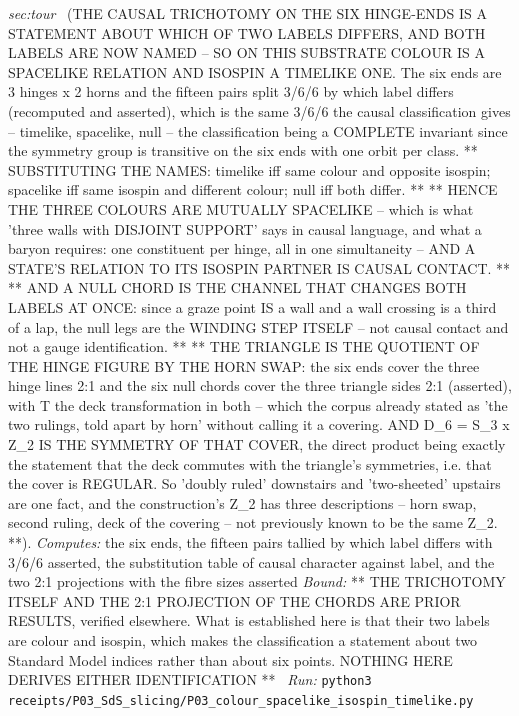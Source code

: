 \begin{description}
\textit{sec:tour} \ (THE CAUSAL TRICHOTOMY ON THE SIX HINGE-ENDS IS A STATEMENT ABOUT WHICH OF TWO LABELS DIFFERS, AND BOTH LABELS ARE NOW NAMED -- SO ON THIS SUBSTRATE COLOUR IS A SPACELIKE RELATION AND ISOSPIN A TIMELIKE ONE. The six ends are 3 hinges x 2 horns and the fifteen pairs split 3/6/6 by which label differs (recomputed and asserted), which is the same 3/6/6 the causal classification gives -- timelike, spacelike, null -- the classification being a COMPLETE invariant since the symmetry group is transitive on the six ends with one orbit per class. ** SUBSTITUTING THE NAMES: timelike iff same colour and opposite isospin; spacelike iff same isospin and different colour; null iff both differ. ** ** HENCE THE THREE COLOURS ARE MUTUALLY SPACELIKE -- which is what 'three walls with DISJOINT SUPPORT' says in causal language, and what a baryon requires: one constituent per hinge, all in one simultaneity -- AND A STATE'S RELATION TO ITS ISOSPIN PARTNER IS CAUSAL CONTACT. ** ** AND A NULL CHORD IS THE CHANNEL THAT CHANGES BOTH LABELS AT ONCE: since a graze point IS a wall and a wall crossing is a third of a lap, the null legs are the WINDING STEP ITSELF -- not causal contact and not a gauge identification. ** ** THE TRIANGLE IS THE QUOTIENT OF THE HINGE FIGURE BY THE HORN SWAP: the six ends cover the three hinge lines 2:1 and the six null chords cover the three triangle sides 2:1 (asserted), with T the deck transformation in both -- which the corpus already stated as 'the two rulings, told apart by horn' without calling it a covering. AND D\_6 = S\_3 x Z\_2 IS THE SYMMETRY OF THAT COVER, the direct product being exactly the statement that the deck commutes with the triangle's symmetries, i.e. that the cover is REGULAR. So 'doubly ruled' downstairs and 'two-sheeted' upstairs are one fact, and the construction's Z\_2 has three descriptions -- horn swap, second ruling, deck of the covering -- not previously known to be the same Z\_2. **). 
\emph{Computes:} the six ends, the fifteen pairs tallied by which label differs with 3/6/6 asserted, the substitution table of causal character against label, and the two 2:1 projections with the fibre sizes asserted
 \emph{Bound:} ** THE TRICHOTOMY ITSELF AND THE 2:1 PROJECTION OF THE CHORDS ARE PRIOR RESULTS, verified elsewhere. What is established here is that their two labels are colour and isospin, which makes the classification a statement about two Standard Model indices rather than about six points. NOTHING HERE DERIVES EITHER IDENTIFICATION **
\ \emph{Run:} \texttt{python3 receipts/P03\_SdS\_slicing/P03\_colour\_spacelike\_isospin\_timelike.py}

\end{description}

